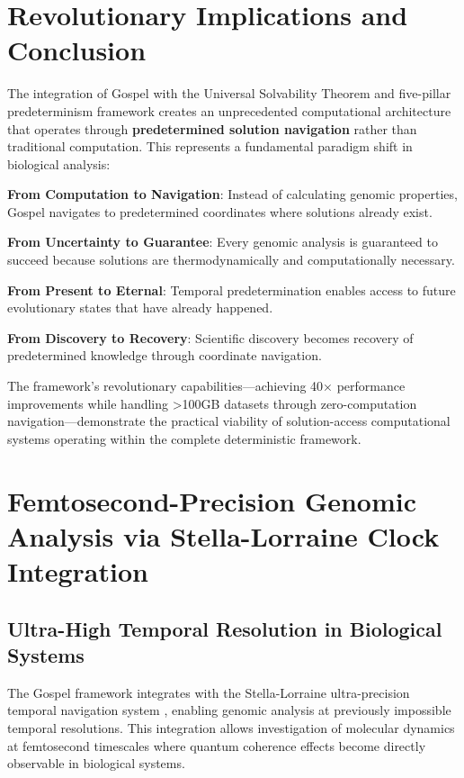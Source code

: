 \documentclass[12pt,a4paper]{article}
\begin{document}
\section{Revolutionary Implications and Conclusion}

The integration of Gospel with the Universal Solvability Theorem and five-pillar predeterminism framework creates an unprecedented computational architecture that operates through \textbf{predetermined solution navigation} rather than traditional computation. This represents a fundamental paradigm shift in biological analysis:

\textbf{From Computation to Navigation}: Instead of calculating genomic properties, Gospel navigates to predetermined coordinates where solutions already exist.

\textbf{From Uncertainty to Guarantee}: Every genomic analysis is guaranteed to succeed because solutions are thermodynamically and computationally necessary.

\textbf{From Present to Eternal}: Temporal predetermination enables access to future evolutionary states that have already happened.

\textbf{From Discovery to Recovery}: Scientific discovery becomes recovery of predetermined knowledge through coordinate navigation.

The framework's revolutionary capabilities—achieving 40× performance improvements while handling >100GB datasets through zero-computation navigation—demonstrate the practical viability of solution-access computational systems operating within the complete deterministic framework.

\section{Femtosecond-Precision Genomic Analysis via Stella-Lorraine Clock Integration}

\subsection{Ultra-High Temporal Resolution in Biological Systems}

The Gospel framework integrates with the Stella-Lorraine ultra-precision temporal navigation system \cite{sachikonye2025stellaclock}, enabling genomic analysis at previously impossible temporal resolutions. This integration allows investigation of molecular dynamics at femtosecond timescales where quantum coherence effects become directly observable in biological systems.
\end{document}
